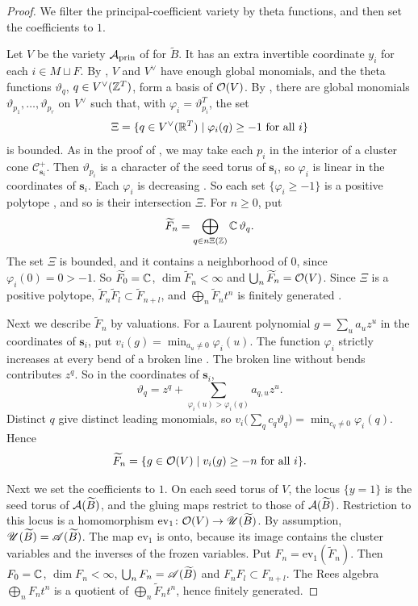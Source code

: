 \documentclass[12pt, letter]{amsart}
\theoremstyle{definition}
\begin{document}
\begin{proof}
We filter the principal-coefficient variety by theta functions, and then set the coefficients to $1$.

Let $V$ be the variety $\mathcal{A}_{\mathrm{prin}}$ of \cite{GHKK} for $\widetilde B$.
It has an extra invertible coordinate $y_i$ for each $i\in M\sqcup F$.
By \cite[Propositions~8.28 and~8.20]{GHKK}, $V$ and $V^\vee$ have enough global monomials, and the theta functions $\vartheta_q$, $q\in V^\vee(\mathbb{Z}^T)$, form a basis of $\mathcal{O}(V)$.
By \cite[Lemma~8.19]{GHKK}, there are global monomials $\vartheta_{p_1},\dots,\vartheta_{p_r}$ on $V^\vee$ such that, with $\varphi_i=\vartheta_{p_i}^T$, the set
\[
 \Xi=\{q\in V^\vee(\mathbb{R}^T)\mid\varphi_i(q)\ge-1\ \text{for all }i\}
\]
is bounded.
As in the proof of \cite[Theorem~8.23]{GHKK}, we may take each $p_i$ in the interior of a cluster cone $\mathcal C^+_{\mathbf s_i}$.
Then $\vartheta_{p_i}$ is a character of the seed torus of $\mathbf s_i$, so $\varphi_i$ is linear in the coordinates of $\mathbf s_i$.
Each $\varphi_i$ is decreasing \cite[Proposition~8.14]{GHKK}.
So each set $\{\varphi_i\ge-1\}$ is a positive polytope \cite[Lemma~8.7]{GHKK}, and so is their intersection $\Xi$.
For $n\ge0$, put
\[
 \widetilde F_n=\bigoplus_{q\in n\Xi(\mathbb{Z})}\mathbb{C}\,\vartheta_q .
\]
The set $\Xi$ is bounded, and it contains a neighborhood of $0$, since $\varphi_i(0)=0>-1$.
So $\widetilde F_0=\mathbb{C}$, $\dim\widetilde F_n<\infty$ and $\bigcup_n\widetilde F_n=\mathcal{O}(V)$.
Since $\Xi$ is a positive polytope, $\widetilde F_n\widetilde F_l\subset\widetilde F_{n+l}$, and $\bigoplus_n\widetilde F_nt^n$ is finitely generated \cite[Theorem~8.23]{GHKK}.

Next we describe $\widetilde F_n$ by valuations.
For a Laurent polynomial $g=\sum_ua_uz^u$ in the coordinates of $\mathbf s_i$, put $v_i(g)=\min_{a_u\ne0}\varphi_i(u)$.
The function $\varphi_i$ strictly increases at every bend of a broken line \cite[Lemma~8.17]{GHKK}.
The broken line without bends contributes $z^q$.
So in the coordinates of $\mathbf s_i$,
\[
 \vartheta_q=z^q+\sum_{\varphi_i(u)>\varphi_i(q)}a_{q,u}z^u .
\]
Distinct $q$ give distinct leading monomials, so $v_i\bigl(\sum_qc_q\vartheta_q\bigr)=\min_{c_q\ne0}\varphi_i(q)$.
Hence
\begin{equation}\label{eq:theta-valuation}
 \widetilde F_n=\{g\in\mathcal{O}(V)\mid v_i(g)\ge-n\ \text{for all }i\}.
\end{equation}

Next we set the coefficients to $1$.
On each seed torus of $V$, the locus $\{y=1\}$ is the seed torus of $\mathcal{A}(\widetilde B)$, and the gluing maps restrict to those of $\mathcal{A}(\widetilde B)$.
Restriction to this locus is a homomorphism $\mathrm{ev}_1\colon\mathcal{O}(V)\to\mathscr{U}(\widetilde B)$.
By assumption, $\mathscr{U}(\widetilde B)=\mathscr{A}(\widetilde B)$.
The map $\mathrm{ev}_1$ is onto, because its image contains the cluster variables and the inverses of the frozen variables.
Put $F_n=\mathrm{ev}_1(\widetilde F_n)$.
Then $F_0=\mathbb{C}$, $\dim F_n<\infty$, $\bigcup_nF_n=\mathscr{A}(\widetilde B)$ and $F_nF_l\subset F_{n+l}$.
The Rees algebra $\bigoplus_nF_nt^n$ is a quotient of $\bigoplus_n\widetilde F_nt^n$, hence finitely generated.


\end{proof}
\end{document}
